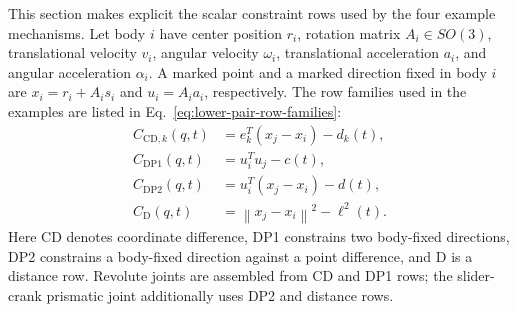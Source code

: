 \documentclass[preprint,12pt]{elsarticle}
\begin{document}
This section makes explicit the scalar constraint rows used by the four
example mechanisms. Let body $i$ have center position $r_i$, rotation matrix
$A_i\in SO(3)$, translational velocity $v_i$, angular velocity $\omega_i$,
translational acceleration $a_i$, and angular acceleration $\alpha_i$. A
marked point and a marked direction fixed in body $i$ are
$x_i=r_i+A_i s_i$ and $u_i=A_i a_i$, respectively. The row families used in
the examples are listed in Eq.~\eqref{eq:lower-pair-row-families}:
\begin{align}
  C_{\mathrm{CD},k}(q,t)
    &= e_k^T\left(x_j-x_i\right)-d_k(t),\\
  C_{\mathrm{DP1}}(q,t)
    &= u_i^T u_j-c(t),\\
  C_{\mathrm{DP2}}(q,t)
    &= u_i^T\left(x_j-x_i\right)-d(t),\\
  C_{\mathrm{D}}(q,t)
    &= \left\|x_j-x_i\right\|^2-\ell^2(t).
  \label{eq:lower-pair-row-families}
\end{align}
Here CD denotes coordinate difference, DP1 constrains two body-fixed
directions, DP2 constrains a body-fixed direction against a point difference,
and D is a distance row. Revolute joints are assembled from CD and DP1 rows;
the slider-crank prismatic joint additionally uses DP2 and distance rows.
\end{document}

